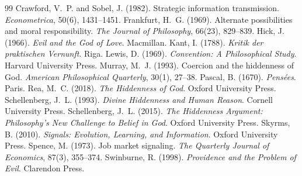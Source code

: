 \documentclass{situationist-preprint}
\begin{document}
\begin{thebibliography}{99}\small
{} Crawford, V.~P. and Sobel, J. (1982). Strategic information transmission. \emph{Econometrica}, 50(6), 1431--1451.
 Frankfurt, H.~G. (1969). Alternate possibilities and moral responsibility. \emph{The Journal of Philosophy}, 66(23), 829--839.
 Hick, J. (1966). \emph{Evil and the God of Love}. Macmillan.
 Kant, I. (1788). \emph{Kritik der praktischen Vernunft}. Riga.
 Lewis, D. (1969). \emph{Convention: A Philosophical Study}. Harvard University Press.
 Murray, M.~J. (1993). Coercion and the hiddenness of God. \emph{American Philosophical Quarterly}, 30(1), 27--38.
 Pascal, B. (1670). \emph{Pens\'ees}. Paris.
 Rea, M.~C. (2018). \emph{The Hiddenness of God}. Oxford University Press.
 Schellenberg, J.~L. (1993). \emph{Divine Hiddenness and Human Reason}. Cornell University Press.
 Schellenberg, J.~L. (2015). \emph{The Hiddenness Argument: Philosophy's New Challenge to Belief in God}. Oxford University Press.
 Skyrms, B. (2010). \emph{Signals: Evolution, Learning, and Information}. Oxford University Press.
 Spence, M. (1973). Job market signaling. \emph{The Quarterly Journal of Economics}, 87(3), 355--374.
 Swinburne, R. (1998). \emph{Providence and the Problem of Evil}. Clarendon Press.
\end{thebibliography}
\end{document}
